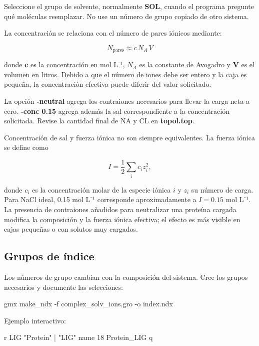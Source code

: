 \documentclass[
  spanish,
  11pt,
  a4paper]{article}
\newenvironment{Shaded}{\begin{snugshade}}{\end{snugshade}}
\newcommand{\AttributeTok}[1]{\textcolor[rgb]{0.13,0.29,0.53}{#1}}
\newcommand{\ExtensionTok}[1]{#1}
\newcommand{\NormalTok}[1]{#1}
\begin{document}
Seleccione el grupo de solvente, normalmente \textbf{SOL}, cuando el
programa pregunte qué moléculas reemplazar. No use un número de grupo
copiado de otro sistema.

La concentración se relaciona con el número de pares iónicos mediante:

\[
N_{\mathrm{pares}} \approx c\,N_A\,V
\]

donde \textbf{c} es la concentración en mol L⁻¹, \(N_A\) es la constante
de Avogadro y \textbf{V} es el volumen en litros. Debido a que el número
de iones debe ser entero y la caja es pequeña, la concentración efectiva
puede diferir del valor solicitado.

La opción \textbf{-neutral} agrega los contraiones necesarios para
llevar la carga neta a cero. \textbf{-conc 0.15} agrega además la sal
correspondiente a la concentración solicitada. Revise la cantidad final
de NA y CL en \textbf{topol.top}.

Concentración de sal y fuerza iónica no son siempre equivalentes. La
fuerza iónica se define como

\[
I=\frac{1}{2}\sum_i c_i z_i^2,
\]

donde \(c_i\) es la concentración molar de la especie iónica \(i\) y
\(z_i\) su número de carga. Para NaCl ideal, 0.15 mol L⁻¹ corresponde
aproximadamente a \(I=0.15\) mol L⁻¹. La presencia de contraiones
añadidos para neutralizar una proteína cargada modifica la composición y
la fuerza iónica efectiva; el efecto es más visible en cajas pequeñas o
con solutos muy cargados.

\subsection{Grupos de índice}\label{grupos-de-uxedndice}

Los números de grupo cambian con la composición del sistema. Cree los
grupos necesarios y documente las selecciones:

\begin{Shaded}
\begin{Highlighting}[]
\ExtensionTok{gmx}\NormalTok{ make\_ndx }\AttributeTok{{-}f}\NormalTok{ complex\_solv\_ions.gro }\AttributeTok{{-}o}\NormalTok{ index.ndx}
\end{Highlighting}
\end{Shaded}

Ejemplo interactivo:

\begin{Shaded}
\begin{Highlighting}[]
\NormalTok{r LIG}
\NormalTok{"Protein" | "LIG"}
\NormalTok{name 18 Protein\_LIG}
\NormalTok{q}
\end{Highlighting}
\end{Shaded}
\end{document}
